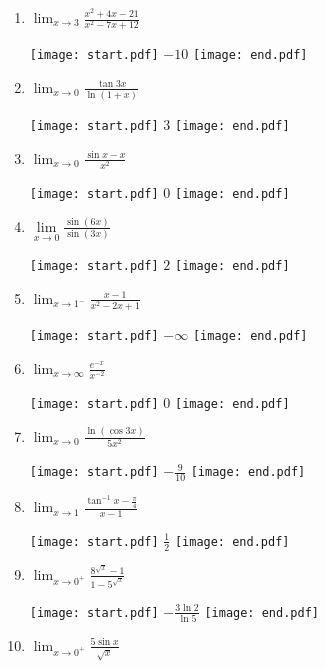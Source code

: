 \documentclass[12pt]{article}
\begin{document}
\begin{enumerate}

\item $\lim_{x \rightarrow 3}{\frac{x^2+4x-21}{x^2-7x+12}}$

\texttt{[image: start.pdf]}
{{$-10$}}
\texttt{[image: end.pdf]}


\item $ \lim_{x \rightarrow 0}{\frac{\tan{3x}}{\ln{(1+x)}}}$

\texttt{[image: start.pdf]}
{{$3$}}
\texttt{[image: end.pdf]}


\item $\lim_{x \rightarrow 0}{\frac{\sin{x}-x}{x^2}}$

\texttt{[image: start.pdf]}
{{$0$}}
\texttt{[image: end.pdf]}


\item $\lim\limits_{x\rightarrow 0} \frac{\sin{(6x)}}{\sin{(3x)}}$ 

\texttt{[image: start.pdf]}
{{$2$}}
\texttt{[image: end.pdf]}


\item $\lim_{x \rightarrow 1^-}{\frac{x-1}{x^2-2x+1}}$

\texttt{[image: start.pdf]}
{{$-\infty$}}
\texttt{[image: end.pdf]}


\item $\lim_{x \rightarrow \infty}{\frac{e^{-x}}{x^{-2}}}$

\texttt{[image: start.pdf]}
{{$0$}}
\texttt{[image: end.pdf]}


\item $\lim_{x \rightarrow 0}{\frac{\ln{(\cos{3x})}}{5x^2}}$

\texttt{[image: start.pdf]}
{{$-\frac{9}{10}$}}
\texttt{[image: end.pdf]}


\item $\lim_{x \rightarrow 1}{\frac{\tan^{-1}{x}-\frac{\pi}{4}}{x-1}}$

\texttt{[image: start.pdf]}
{{$\frac{1}{2}$}}
\texttt{[image: end.pdf]}


\item $\lim_{x \rightarrow 0^{+}}{\frac{8^{\sqrt{x}}-1}{1-5^{\sqrt{x}}}}$

\texttt{[image: start.pdf]}
{{$-\frac{3\ln{2}}{\ln{5}}$}}
\texttt{[image: end.pdf]}


\item $\lim_{x\rightarrow 0^{+}}{\frac{5\sin{x}}{\sqrt{x}}}$


\end{enumerate}
\end{document}
